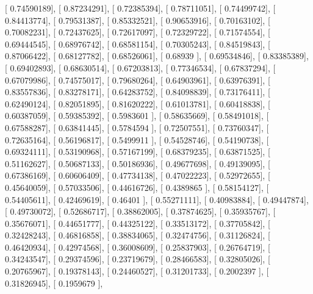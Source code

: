 \documentclass{article}
\begin{document}
       [ 0.74590189],
       [ 0.87234291],
       [ 0.72385394],
       [ 0.78711051],
       [ 0.74499742],
       [ 0.84413774],
       [ 0.79531387],
       [ 0.85332521],
       [ 0.90653916],
       [ 0.70163102],
       [ 0.70082231],
       [ 0.72437625],
       [ 0.72617097],
       [ 0.72329722],
       [ 0.71574554],
       [ 0.69444545],
       [ 0.68976742],
       [ 0.68581154],
       [ 0.70305243],
       [ 0.84519843],
       [ 0.87066422],
       [ 0.68127782],
       [ 0.68526061],
       [ 0.68939   ],
       [ 0.69534846],
       [ 0.83385389],
       [ 0.69402893],
       [ 0.68630514],
       [ 0.67203813],
       [ 0.77346534],
       [ 0.67837294],
       [ 0.67079986],
       [ 0.74575017],
       [ 0.79680264],
       [ 0.64903961],
       [ 0.63976391],
       [ 0.83557836],
       [ 0.83278171],
       [ 0.64283752],
       [ 0.84098839],
       [ 0.73176411],
       [ 0.62490124],
       [ 0.82051895],
       [ 0.81620222],
       [ 0.61013781],
       [ 0.60418838],
       [ 0.60387059],
       [ 0.59385392],
       [ 0.5983601 ],
       [ 0.58635669],
       [ 0.58491018],
       [ 0.67588287],
       [ 0.63841445],
       [ 0.5784594 ],
       [ 0.72507551],
       [ 0.73760347],
       [ 0.72635164],
       [ 0.56196817],
       [ 0.5499911 ],
       [ 0.54528746],
       [ 0.54190738],
       [ 0.69324111],
       [ 0.53190968],
       [ 0.57167199],
       [ 0.68379235],
       [ 0.63871525],
       [ 0.51162627],
       [ 0.50687133],
       [ 0.50186936],
       [ 0.49677698],
       [ 0.49139095],
       [ 0.67386169],
       [ 0.60606409],
       [ 0.47734138],
       [ 0.47022223],
       [ 0.52972655],
       [ 0.45640059],
       [ 0.57033506],
       [ 0.44616726],
       [ 0.4389865 ],
       [ 0.58154127],
       [ 0.54405611],
       [ 0.42469619],
       [ 0.46401   ],
       [ 0.55271111],
       [ 0.40983884],
       [ 0.49447874],
       [ 0.49730072],
       [ 0.52686717],
       [ 0.38862005],
       [ 0.37874625],
       [ 0.35935767],
       [ 0.35676071],
       [ 0.44651777],
       [ 0.44325122],
       [ 0.33513172],
       [ 0.37705842],
       [ 0.32428243],
       [ 0.46816858],
       [ 0.38834065],
       [ 0.32474756],
       [ 0.31126824],
       [ 0.46420934],
       [ 0.42974568],
       [ 0.36008609],
       [ 0.25837903],
       [ 0.26764719],
       [ 0.34243547],
       [ 0.29374596],
       [ 0.23719679],
       [ 0.28466583],
       [ 0.32805026],
       [ 0.20765967],
       [ 0.19378143],
       [ 0.24460527],
       [ 0.31201733],
       [ 0.2002397 ],
       [ 0.31826945],
       [ 0.1959679 ],
\end{document}
